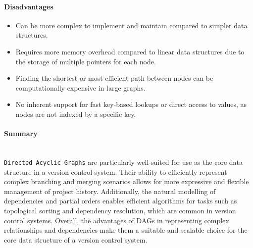 \paragraph{Disadvantages}
\begin{itemize}
    \item Can be more complex to implement and maintain compared to simpler data structures.
    \item Requires more memory overhead compared to linear data structures due to the storage of multiple pointers for each node.
    \item Finding the shortest or most efficient path between nodes can be computationally expensive in large graphs.
    \item No inherent support for fast key-based lookups or direct access to values, as nodes are not indexed by a specific key.
\end{itemize}

\paragraph{Summary}
\hfill\medskip\\
\lstinline{Directed Acyclic Graphs} are particularly well-suited for use as the core data structure in a version control system. Their ability to efficiently represent complex branching and merging scenarios allows for more expressive and flexible management of project history. Additionally, the natural modelling of dependencies and partial orders enables efficient algorithms for tasks such as topological sorting and dependency resolution, which are common in version control systems. Overall, the advantages of DAGs in representing complex relationships and dependencies make them a suitable and scalable choice for the core data structure of a version control system.

